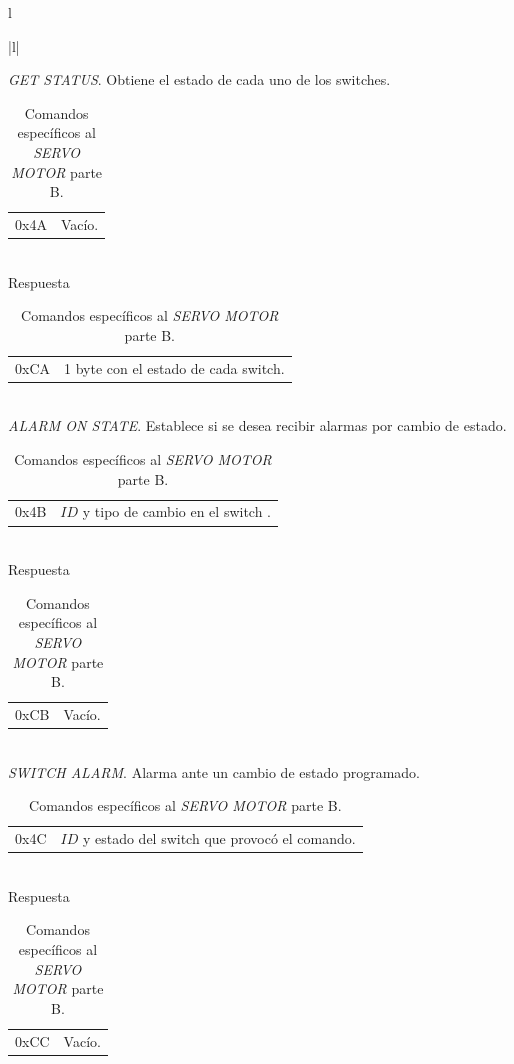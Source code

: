 \begin{table}
	\begin{center}
		\begin{tabular}{l}
			\begin{tabular}{|l|}
	
				\hline
				\emph{GET STATUS}. Obtiene el estado de cada uno de los switches. \\
				\hline
				\begin{tabular}{c|l}
					0x4A & Vac\'io. \\
				\end{tabular}
				\\
				\hline
				Respuesta \\
				\hline
				\begin{tabular}{c|l}
					0xCA & 1 byte con el estado de cada switch. \\
				\end{tabular}
				\\
	
				\hline\hline
				\emph{ALARM ON STATE}. Establece si se desea recibir alarmas por cambio de estado. \\
				\hline
				\begin{tabular}{c|l}
					0x4B & $ID$ y tipo de cambio en el switch .\\
				\end{tabular}
				\\
				\hline
				Respuesta \\
				\hline
				\begin{tabular}{c|l}
					0xCB & Vac\'io. \\
				\end{tabular}
				\\

				\hline\hline
				\emph{SWITCH ALARM}. Alarma ante un cambio de estado programado. \\
				\hline
				\begin{tabular}{c|l}
					0x4C & $ID$ y estado del switch que provoc\'o el comando. \\
				\end{tabular}
				\\
				\hline
				Respuesta \\
				\hline
				\begin{tabular}{c|l}
					0xCC & Vac\'io. \\
				\end{tabular}
				\\
	
				\hline
			\end{tabular}
		\\
		\end{tabular}
		\caption{Comandos espec\'ificos al \emph{SERVO MOTOR} parte B. }
		\label{hT_comm_comandos_servo_b}
	\end{center}
\end{table}

